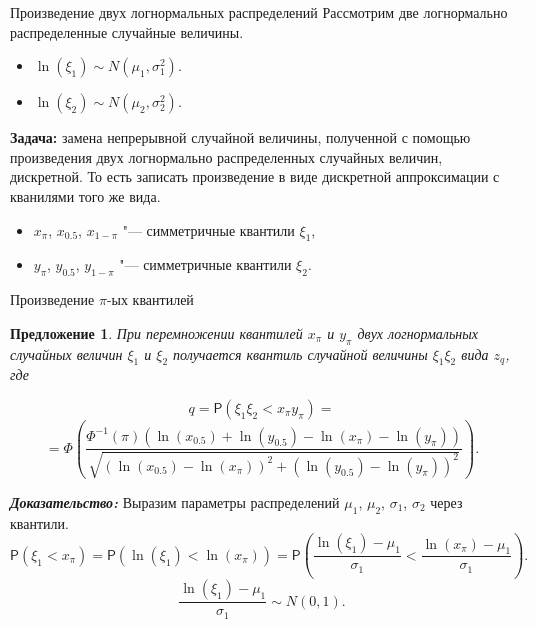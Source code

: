 \documentclass[ucs, notheorems, handout]{beamer}
\newtheorem{proposition}[theorem]{Предложение}
\begin{document}
	\begin{frame}{Произведение двух логнормальных распределений}
		Рассмотрим две логнормально распределенные случайные величины.
		\begin{itemize}
			\item $\ln(\xi_{1}) \sim N(\mu_{1}, \sigma _{1}^{2})$.
			\item $\ln(\xi_{2}) \sim N(\mu_{2}, \sigma _{2}^{2})$.
		\end{itemize}
		
		\textbf{Задача:} замена непрерывной случайной величины, полученной с помощью произведения двух логнормально распределенных случайных величин, дискретной. То есть записать произведение в виде дискретной аппроксимации с кванилями того же вида.
		
		\begin{itemize}
			\item $x_{\pi}$, $x_{0.5}$, $x_{1-\pi}$ "--- симметричные квантили $\xi_{1}$,
			\item $y_{\pi}$, $y_{0.5}$, $y_{1-\pi}$ "--- симметричные квантили $\xi_{2}$.
		\end{itemize}
		
	\end{frame}
	
	\begin{frame}{Произведение $\pi$-ых квантилей}
		\begin{proposition}
			При перемножении квантилей $x_{\pi}$ и $y_{\pi}$ двух логнормальных случайных величин $\xi_{1}$ и $\xi_{2}$ получается квантиль случайной величины $\xi_{1}\xi_{2}$ вида $z_{q}$, где
			
			
				\[q = \mathsf{P}(\xi_{1}\xi_{2}< x_{\pi}y_{\pi})=\]\[= \Phi\left(\frac{\Phi^{-1}(\pi)(\ln(x_{0.5})+\ln(y_{0.5})-\ln(x_{\pi})-\ln(y_{\pi}))}{\sqrt{(\ln(x_{0.5})-\ln(x_{\pi}))^{2}+(\ln(y_{0.5})-\ln(y_{\pi}))^{2}}}\right).\]
			
		\end{proposition}
	\textbf{\textit{Доказательство:}}
	Выразим параметры распределений $\mu_{1}$, $\mu_{2}$, $\sigma_{1}$, $\sigma_{2}$ через квантили.
	\begin{equation*}
		\mathsf{P}(\xi_{1}<x_{\pi}) = \mathsf{P}(\ln(\xi_{1})<\ln(x_{\pi})) = \mathsf{P}\left(\dfrac{\ln(\xi_{1})-\mu_{1}}{\sigma_{1}} < \frac{\ln(x_{\pi})-\mu_{1}}{\sigma_{1}}\right).
	\end{equation*}
	 \[\dfrac{\ln(\xi_{1})-\mu_{1}}{\sigma_{1}} \sim N(0,1).\]
	
	\end{frame}
	
\end{document}
